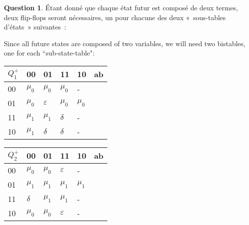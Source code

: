 \documentclass[11pt,a4paper,dvipsnames]{article}
\theoremstyle{definition}%
\newtheorem{Q}{Question}[] %
\newcommand{\fr}[1]{
 	\ifthenelse {\boolean{fr}} {#1} {}
 }
\newcommand{\en}[1]{
 	\ifthenelse {\boolean{en}} {#1} {}
 }
\begin{document}
\begin{Q}
{		\fr{Étant donné que chaque état futur est composé de deux termes, deux flip-flops seront nécessaires, un pour chacune des deux «~sous-tables d'états~» suivantes~:}
		\en{Since all future states are composed of two variables, we will need two bistables, one for each ``sub-state-table":}
		\begin{center}
			\begin{tabular}{|l|l|l|l|l|l} \hline
			$Q^+_1$ & 00         & 01         & 11         & 10         & \multicolumn{1}{l|}{ab} \\ \hline
			00           & $\mu_0$ & $\mu_0$ & $\mu_0$ & - & \\ \cline{1-5}
			01           & $\mu_0$ & $\varepsilon$ & $\mu_0$ & $\mu_0$ & \\ \cline{1-5}
			11           & $\mu_1$ & $\mu_1$ & $\delta$ & - & \\ \cline{1-5}
			10           & $\mu_1$ & $\delta$ & $\delta$ & - & \\ \cline{1-5}
			\end{tabular}
			\begin{tabular}{|l|l|l|l|l|l} \hline
			$Q^+_2$ & 00         & 01         & 11         & 10         & \multicolumn{1}{l|}{ab} \\ \hline
			00           & $\mu_0$ & $\mu_0$ & $\varepsilon$ & - & \\ \cline{1-5}
			01           & $\mu_1$ & $\mu_1$ & $\mu_1$ & $\mu_1$ & \\ \cline{1-5}
			11           & $\delta$ & $\mu_1$ & $\mu_1$ & - & \\ \cline{1-5}
			10           & $\mu_0$ & $\mu_0$ & $\varepsilon$ & - & \\ \cline{1-5}
			\end{tabular}
		\end{center}


}
\end{Q}
\end{document}
